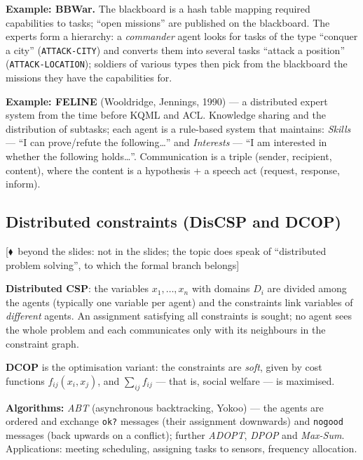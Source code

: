 \documentclass[11pt,a4paper]{article}
\theoremstyle{definition}
\providecommand{\uv}[1]{``#1''}
\newcommand{\mimoq}[1]{\textcolor{markcol}{\textsf{\footnotesize[$\blacklozenge$~beyond the slides: #1]}}}
\begin{document}
\medskip
\noindent\textbf{Example: BBWar.} The blackboard is a hash table mapping required capabilities to
tasks; \uv{open missions} are published on the blackboard. The experts form a hierarchy: a
\emph{commander} agent looks for tasks of the type \uv{conquer a city} (\texttt{ATTACK-CITY}) and
converts them into several tasks \uv{attack a position} (\texttt{ATTACK-LOCATION}); soldiers of
various types then pick from the blackboard the missions they have the capabilities for.

\medskip
\noindent\textbf{Example: FELINE} (Wooldridge, Jennings, 1990) --- a distributed expert system from
the time before KQML and ACL. Knowledge sharing and the distribution of subtasks; each agent is a
rule-based system that maintains:
\emph{Skills} --- \uv{I can prove/refute the following\dots} and \emph{Interests} ---
\uv{I am interested in whether the following holds\dots}. Communication is a triple
(sender, recipient, content), where the content is a hypothesis + a speech act (request, response,
inform).

\subsection{Distributed constraints (DisCSP and DCOP)}

\noindent\mimoq{not in the slides; the topic does speak of \uv{distributed problem solving},
to which the formal branch belongs}

\begin{defbox}
\textbf{Distributed CSP}: the variables $x_1,\dots,x_n$ with domains $D_i$ are divided among the
agents (typically one variable per agent) and the constraints link variables of \emph{different}
agents. An assignment satisfying all constraints is sought; no agent sees the whole problem and
each communicates only with its neighbours in the constraint graph.

\textbf{DCOP} is the optimisation variant: the constraints are \emph{soft}, given by cost
functions $f_{ij}(x_i,x_j)$, and $\sum_{ij} f_{ij}$ --- that is, social welfare --- is maximised.

\textbf{Algorithms:} \emph{ABT} (asynchronous backtracking, Yokoo) --- the agents are ordered and
exchange \texttt{ok?} messages (their assignment downwards) and \texttt{nogood} messages (back
upwards on a conflict); further \emph{ADOPT}, \emph{DPOP} and \emph{Max-Sum}.
Applications: meeting scheduling, assigning tasks to sensors, frequency allocation.
\end{defbox}
\end{document}

